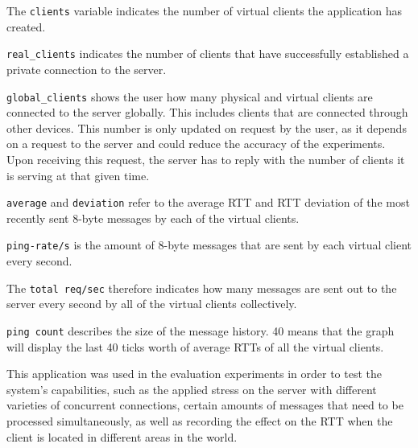\documentclass[bsc, 12pt, twoside, singlespacing, parskip, abbrevs, notimes, normalheadings, logo]{styles/infthesis}
\begin{document}
The \texttt{clients} variable indicates the number of virtual clients the application has created. 

\texttt{real\_clients} indicates the number of clients that have successfully established a private connection to the server.

\texttt{global\_clients} shows the user how many physical and virtual clients are connected to the server globally. This includes clients that are connected through other devices. This number is only updated on request by the user, as it depends on a request to the server and could reduce the accuracy of the experiments. Upon receiving this request, the server has to reply with the number of clients it is serving at that given time.

\texttt{average} and \texttt{deviation} refer to the average RTT and RTT deviation of the most recently sent 8-byte messages by each of the virtual clients.

\texttt{ping-rate/s} is the amount of 8-byte messages that are sent by each virtual client every second.

The \texttt{total req/sec} therefore indicates how many messages are sent out to the server every second by all of the virtual clients collectively.

\texttt{ping count} describes the size of the message history. 40 means that the graph will display the last 40 ticks worth of average RTTs of all the virtual clients.

This application was used in the evaluation experiments in order to test the system's capabilities, such as the applied stress on the server with different varieties of concurrent connections, certain amounts of messages that need to be processed simultaneously, as well as recording the effect on the RTT when the client is located in different areas in the world.
\end{document}
